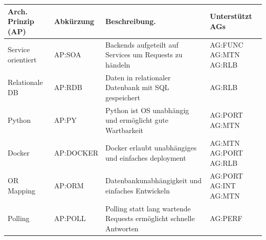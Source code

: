 \begin{center}
    \begin{tabular}{|l|l| p{5cm} |p{3cm}|}
        \hline
        \textbf{Arch. Prinzip (AP)} & \textbf{Abkürzung} & \textbf{Beschreibung.} & \textbf{Unterstützt AGs} \\
        \hline
        Service orientiert & AP:SOA & Backends aufgeteilt auf Services um Requests zu händeln & AG:FUNC AG:MTN AG:RLB \\
        Relationale DB & AP:RDB & Daten in relationaler Datenbank mit SQL gespeichert & AG:RLB \\
        Python & AP:PY & Python ist OS unabhängig und ermöglicht gute Wartbarkeit & AG:PORT AG:MTN \\
        Docker & AP:DOCKER & Docker erlaubt unabhängiges und einfaches deployment & AG:MTN AG:PORT AG:RLB \\
        OR Mapping & AP:ORM & Datenbankunabhängigkeit und einfaches Entwickeln & AG:PORT AG:INT AG:MTN \\
        Polling & AP:POLL & Polling statt lang wartende Requests ermöglicht schnelle Antworten & AG:PERF \\
        \hline
    \end{tabular}
    \label{tab:principles}
\end{center}
